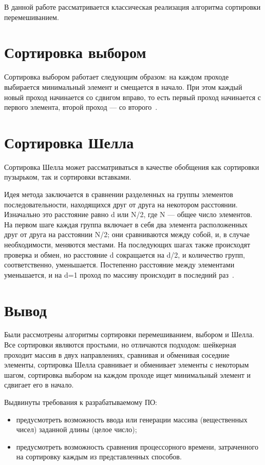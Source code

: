 \documentclass[12pt]{report}
\begin{document}
    В данной работе рассматривается классическая реализация алгоритма сортировки перемешиванием.


    \section{Сортировка выбором}
    Сортировка выбором работает следующим образом:
    на каждом проходе выбирается минимальный элемент и смещается в начало.
    При этом каждый новый проход начинается со сдвигом вправо,
    то есть первый проход начинается с первого элемента, второй проход — со второго~\cite{Selection}.


    \section{Сортировка Шелла}
    Сортировка Шелла может рассматриваться в качестве обобщения как сортировки пузырьком, так и сортировки вставками.

    Идея метода заключается в сравнении разделенных на группы элементов последовательности,
    находящихся друг от друга на некотором расстоянии.
    Изначально это расстояние равно d или N/2, где N — общее число элементов.
    На первом шаге каждая группа включает в себя два элемента расположенных друг от друга на расстоянии N/2;
    они сравниваются между собой, и, в случае необходимости, меняются местами.
    На последующих шагах также происходят проверка и обмен, но расстояние d сокращается на d/2,
    и количество групп, соответственно, уменьшается. Постепенно расстояние между элементами уменьшается,
    и на d=1 проход по массиву происходит в последний раз~\cite{Shell}.


    \section{Вывод}
    Были рассмотрены алгоритмы сортировки перемешиванием, выбором и Шелла.
    Все сортировки являются простыми, но отличаются подходом: шейкерная проходит массив в двух направлениях,
    сравнивая и обменивая соседние элементы, сортировка Шелла сравнивает и обменивает элементы с некоторым шагом,
    сортировка выбором на каждом проходе ищет минимальный элемент и сдвигает его в начало.
    
    Выдвинуты требования к разрабатываемому ПО:
    \begin{itemize}
    	\item предусмотреть возможность ввода или генерации массива (вещественных чисел)
    	заданной длины (целое число);
    	\item предусмотреть возможность сравнения процессорного времени,
    	затраченного на сортировку каждым из представленных способов.
    \end{itemize}
\end{document}
